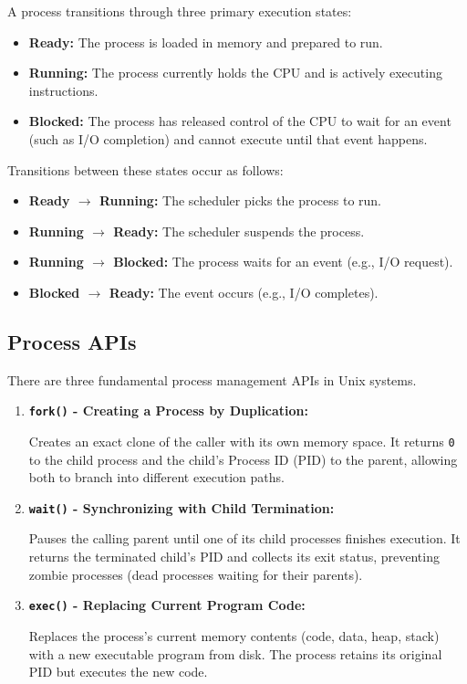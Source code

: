 \documentclass[conference]{IEEEtran}
\begin{document}
A process transitions through three primary execution states:
\begin{itemize}
    \item \textbf{Ready:} The process is loaded in memory and prepared to run.
    \item \textbf{Running:} The process currently holds the CPU and is actively executing instructions.
    \item \textbf{Blocked:} The process has released control of the CPU to wait for an event (such as I/O completion) and cannot execute until that event happens.
\end{itemize}

\noindent Transitions between these states occur as follows:
\begin{itemize}
    \item \textbf{Ready $\rightarrow$ Running:} The scheduler picks the process to run.
    \item \textbf{Running $\rightarrow$ Ready:} The scheduler suspends the process.
    \item \textbf{Running $\rightarrow$ Blocked:} The process waits for an event (e.g., I/O request).
    \item \textbf{Blocked $\rightarrow$ Ready:} The event occurs (e.g., I/O completes).
\end{itemize}

\subsection{Process APIs}

There are three fundamental process management APIs in Unix systems.

\begin{enumerate}
    \item \textbf{\texttt{fork()} - Creating a Process by Duplication:} 
    
    Creates an exact clone of the caller with its own memory space. It returns \texttt{0} to the child process and the child's Process ID (PID) to the parent, allowing both to branch into different execution paths.
    
    \item \textbf{\texttt{wait()} - Synchronizing with Child Termination:} 
    
    Pauses the calling parent until one of its child processes finishes execution. It returns the terminated child's PID and collects its exit status, preventing zombie processes (dead processes waiting for their parents).
    
    \item \textbf{\texttt{exec()} - Replacing Current Program Code:} 
    
    Replaces the process's current memory contents (code, data, heap, stack) with a new executable program from disk. The process retains its original PID but executes the new code.
\end{enumerate}
\end{document}
